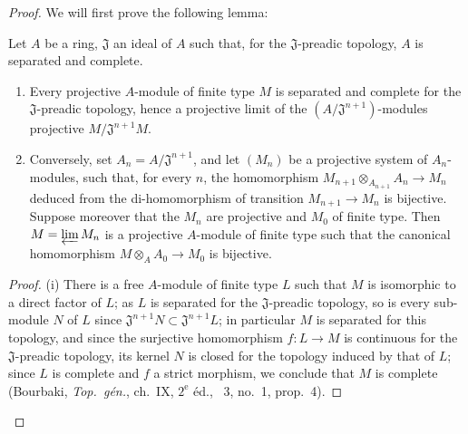 \begin{proof}
We will first prove the following lemma:

\begin{lemma}[18.3.2.1]
\label{IV.18.3.2.1}
Let $A$ be a ring, $\mathfrak{J}$ an ideal of $A$ such that, for the $\mathfrak{J}$-preadic topology, $A$ is separated and complete.
\begin{enumerate}
  \item[(i)] Every projective $A$-module of finite type $M$ is separated and complete for the $\mathfrak{J}$-preadic topology, hence a projective limit of the $(A/\mathfrak{J}^{n+1})$-modules projective $M/\mathfrak{J}^{n+1}M$.
  \item[(ii)] Conversely, set $A_n=A/\mathfrak{J}^{n+1}$, and let $(M_n)$ be a projective system of $A_n$-modules, such that, for every $n$, the homomorphism $M_{n+1}\otimes_{A_{n+1}}A_n\to M_n$ deduced from the di-homomorphism of transition $M_{n+1}\to M_n$ is bijective.
Suppose moreover that the $M_n$ are projective and $M_0$ of finite type.
Then $M=\varprojlim M_n$ is a projective $A$-module of finite type such that the canonical homomorphism $M\otimes_A A_0\to M_0$ is bijective.
\end{enumerate}
\end{lemma}

\begin{proof}
(i) There is a free $A$-module of finite type $L$ such that $M$ is isomorphic to a direct factor of $L$;
as $L$ is separated for the $\mathfrak{J}$-preadic topology, so is every sub-module $N$ of $L$ since $\mathfrak{J}^{n+1}N\subset\mathfrak{J}^{n+1}L$;
in particular $M$ is separated for this topology, and since the surjective homomorphism $f:L\to M$ is continuous for the $\mathfrak{J}$-preadic topology, its kernel $N$ is closed for the topology induced by that of $L$;
since $L$ is complete and $f$ a strict morphism, we conclude that $M$ is complete (Bourbaki, \emph{Top.\ g\'en.}, ch.~IX, $2^{\text{e}}$ \'ed., \textsection~3, no.~1, prop.~4).


\end{proof}
\end{proof}
